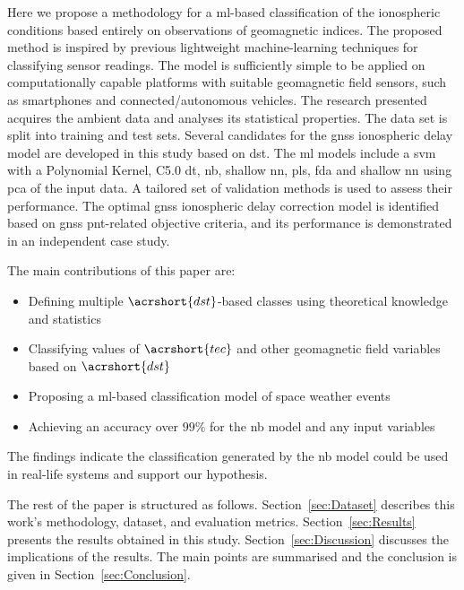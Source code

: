 \documentclass[sn-mathphys-num]{sn-jnl}%
\begin{document}
Here we propose a methodology for a \acrlong{ml}-based classification of the ionospheric conditions based entirely on observations of geomagnetic indices. The proposed method is inspired by previous lightweight machine-learning techniques \cite{filjar2020comparison} for classifying sensor readings. The model is sufficiently simple to be applied on computationally capable platforms with suitable geomagnetic field sensors, such as smartphones and connected/autonomous vehicles. The research presented acquires the ambient data and analyses its statistical properties. The data set is split into training and test sets. Several candidates for the \acrshort{gnss} ionospheric delay model are developed in this study based on \acrfull{dst}. The \acrfull{ml} models include a \acrfull{svm} with a Polynomial Kernel, C5.0 \acrfull{dt}, \acrfull{nb}, shallow \acrfull{nn}, \acrfull{pls}, \acrfull{fda} and shallow \acrfull{nn} using \acrfull{pca} of the input data. A tailored set of validation methods is used to assess their performance. The optimal \acrshort{gnss} ionospheric delay correction model is identified based on \acrshort{gnss} \acrshort{pnt}-related objective criteria, and its performance is demonstrated in an independent case study.

The main contributions of this paper are:

\begin{itemize}
    \item Defining multiple $\acrshort{dst}$-based classes using theoretical knowledge and statistics
    \item Classifying values of $\acrshort{tec}$ and other geomagnetic field variables based on $\acrshort{dst}$
    \item Proposing a \acrlong{ml}-based classification model of space weather events
    \item Achieving an accuracy over $99\%$ for the \acrfull{nb} model and any input variables
\end{itemize}

The findings indicate the classification generated by the \acrshort{nb} model could be used in real-life systems and support our hypothesis.

The rest of the paper is structured as follows. Section~\ref{sec:Dataset} describes this work's methodology, dataset, and evaluation metrics. Section~\ref{sec:Results} presents the results obtained in this study. Section~\ref{sec:Discussion} discusses the implications of the results. The main points are summarised and the conclusion is given in Section~\ref{sec:Conclusion}.
\end{document}
